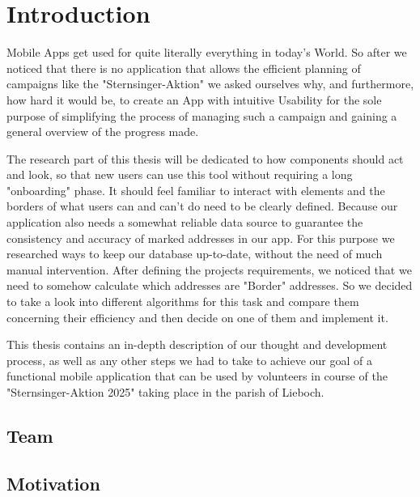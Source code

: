 \Author{\daAuthorTwo} 

\section{Introduction}


Mobile Apps get used for quite literally everything in today's World. So after
we noticed that there is no application that allows the efficient planning of
campaigns like the "Sternsinger-Aktion" we asked ourselves why, and furthermore,
how hard it would be, to create an App with intuitive Usability for the sole
purpose of simplifying the process of managing such a campaign and gaining a
general overview of the progress made. \newline

The research part of this thesis will be dedicated to how components should act
and look, so that new users can use this tool without requiring a long "onboarding" phase. It should feel familiar to interact with elements and the
borders of what users can and can't do need to be clearly defined. Because our
application also needs a somewhat reliable data source to guarantee the
consistency and accuracy of marked addresses in our app. For this purpose we
researched ways to keep our database up-to-date, without the need of much manual
intervention. After defining the projects requirements, we noticed that we need
to somehow calculate which addresses are "Border" addresses. So we decided to take a look into different algorithms for this task and compare them concerning their efficiency and then decide on one of them and implement it.
\newline

This thesis contains an in-depth description of our thought and development
process, as well as any other steps we had to take to achieve our goal of a
functional mobile application that can be used by volunteers in course of the
"Sternsinger-Aktion 2025" taking place in the parish of Lieboch. 

\subsection{Team}

\subsection{Motivation}

\newpage